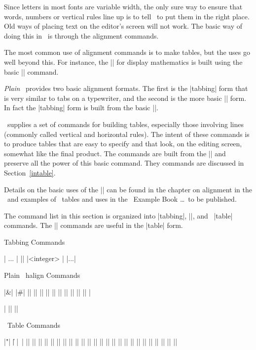   \relax \fi %

\def\cqu{}

Since letters in most fonts are variable width, the only sure way to ensure
that words, numbers or vertical rules line up is to tell \tex\ to put them in
the right place. Old ways of placing text on the editor's screen will not
work. The basic way of doing this in \tex\ is through the alignment commands.

The most common use of alignment commands is to make tables, but the uses go
well beyond this. For instance, the |\eqalign| for display mathematics is
built using the basic |\halign| command.


{\it Plain} \tex\ provides two basic alignment formats. The first is the
|tabbing| form that is very similar to tabs on a typewriter, and the second is
the more basic |\halign| form. In fact the |tabbing| form is built from the
basic |\halign|.

\intex\ supplies a set of commands for building tables, especially those
involving lines (commonly called vertical and  horizontal rules). 
The intent of these commands is to produce tables that are
easy to specify and that look, on the editing screen, somewhat like the final
product.  The commands are built from the |\halign| and preserve all
the power of this basic command. They commands are discussed in 
Section~\ref{intable}.

Details on the basic uses of the |\halign| 
can be found in the chapter on alignment in the \texbook\ and
examples of \intex\ tables and uses in the \tex\ Example Book \dots\ to be published. 

The command list in this section is organized into |tabbing|, |\halign|, and
\intex\ |table| commands. The |\halign| commands are useful in the |table|
form.
\bigbreak
\centerline{\sssheadfont Tabbing Commands}
\nobreak
\begintwocolumn
\pla|\+ ... \cr|
\pla|\cleartabs|
\pla|\settabs <integer> \columns|
\pla|\tabalign ...\cr|
\endthreecolumn
\bigbreak
\centerline{\sssheadfont Plain \tex\  halign  Commands}
\begintwocolumn
\pri|&|
\pri|#|
\pri|\cr|
\pri|\halign|
\pla|\hidewidth|
\pla|\ialign|
\pla|\multispan|
\pri|\noalign|
\pla|\oalign|
\pri|\omit|
\pla|\openup| 
\pri|\span|
\ext|\strut|
\pri|\tabskip|
\pri|\valign|
\endthreecolumn
\bigbreak

\centerline{\sssheadfont \intex\ Table Commands}
\begintwocolumn
\ext\vrt
\ext|"|
\ext|\|\vrt
\ext|~|
\ext|\:|
\ext|\-|
\ext|\br  \er|
\ext|\begintable|
\ext|\begintableformat|
\ext|\endtable|
\ext|\endtableformat|
\ext|\center|
\ext|\displaymath|
\ext|\everytable|
\ext|\fulltablerule|
\ext|\left|
\ext|\math|
\ext|\midtabglue|
\ext|\modifystrut \mst|
\ext|\right|
\ext|\sa|
\ext|\sprule|
\ext|\tablespread|
\ext|\tcs|
\ext|\thrule|
\ext|\tr|
\ext|\tvrule|
\ext|\use|
\ext|\zerocenteredbox \zb|
\endthreecolumn

